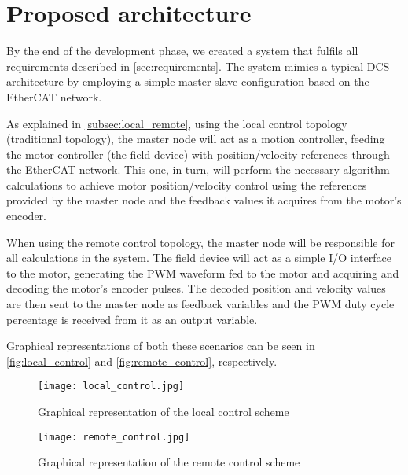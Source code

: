 \section{Proposed architecture} \label{sec:proposed-arch}

By the end of the development phase, we created a system that fulfils all requirements described in \autoref{sec:requirements}.
The system mimics a typical DCS architecture by employing a simple master-slave configuration based on the EtherCAT network.

As explained in \autoref{subsec:local_remote}, using the local control topology (traditional topology), the master node will act as a motion controller, feeding the motor controller (the field device) with position/velocity references through the EtherCAT network.
This one, in turn, will perform the necessary algorithm calculations to achieve motor position/velocity control using the references provided by the master node and the feedback values it acquires from the motor's encoder.

When using the remote control topology, the master node will be responsible for all calculations in the system.
The field device will act as a simple I/O interface to the motor, generating the PWM waveform fed to the motor and acquiring and decoding the motor's encoder pulses.
The decoded position and velocity values are then sent to the master node as feedback variables and the PWM duty cycle percentage is received from it as an output variable.

Graphical representations of both these scenarios can be seen in \autoref{fig:local_control} and \autoref{fig:remote_control}, respectively.


\begin{figure}[htp]
	\centering
	\texttt{[image: local\_control.jpg]}
	\caption{Graphical representation of the local control scheme}
	\label{fig:local_control}
\end{figure}

\begin{figure}[htp]
	\centering
	\texttt{[image: remote\_control.jpg]}
	\caption{Graphical representation of the remote control scheme}
	\label{fig:remote_control}
\end{figure}





